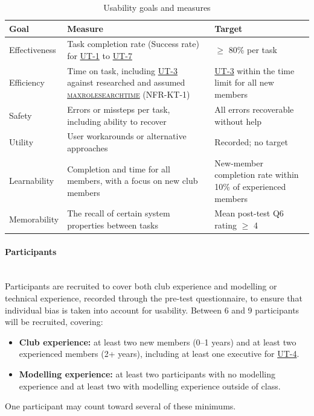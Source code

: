 \documentclass[12pt, titlepage]{article}
\DeclareRobustCommand{\cname}[1]{{\renewcommand{\_}{\textunderscore\allowbreak}\textsc{#1}}}
\newcommand{\const}[1]{\hyperlink{const:\detokenize{#1}}{\cname{#1}}}
\newcommand{\utref}[1]{\hyperlink{ut:#1}{#1}}
\begin{document}
\begin{table}[H]
\centering
\caption{Usability goals and measures}
\label{tab:usability-goals}
\small
\begin{tabularx}{\textwidth}{>{\raggedright\arraybackslash}p{2.3cm} >{\raggedright\arraybackslash}X >{\raggedright\arraybackslash}p{3.6cm}}
\toprule
\textbf{Goal} & \textbf{Measure} & \textbf{Target} \\
\midrule
Effectiveness & Task completion rate (Success rate) for \utref{UT-1} to \utref{UT-7} & $\geq$ 80\% per task \\
Efficiency & Time on task, including \utref{UT-3} against researched and assumed \const{max\_role\_search\_time} (NFR-KT-1) & \utref{UT-3} within the time limit for all new members \\
Safety & Errors or missteps per task, including ability to recover & All errors recoverable without help \\
Utility & User workarounds or alternative approaches & Recorded; no target \\
Learnability & Completion and time for all members, with a focus on new club members & New-member completion rate within 10\% of experienced members \\
Memorability & The recall of certain system properties between tasks & Mean post-test Q6 rating $\geq$ 4 \\
\bottomrule
\end{tabularx}
\end{table}

\paragraph{Participants}\mbox{}\\
Participants are recruited to cover both club experience and modelling or technical experience,
recorded through the pre-test questionnaire, to ensure that individual bias is taken into account for usability.
Between 6 and 9 participants will be recruited, covering:
\begin{itemize}
  \item \textbf{Club experience:} at least two new members (0--1 years) and at least
    two experienced members (2+ years), including at least one executive for \utref{UT-4}.
  \item \textbf{Modelling experience:} at least two participants with no modelling
    experience and at least two with modelling experience outside of class.
\end{itemize}
One participant may count toward several of these minimums.
\end{document}

